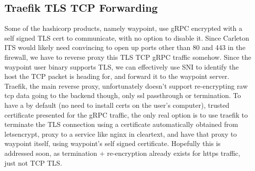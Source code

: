 \documentclass{article}
\begin{document}
\subsection{Traefik TLS TCP Forwarding}
Some of the hashicorp products, namely waypoint, use gRPC encrypted with a self signed TLS cert to communicate, with no option to disable it. Since Carleton ITS would likely need convincing to open up ports other than 80 and 443 in the firewall, we have to reverse proxy this TLS TCP gRPC traffic somehow. Since the waypoint user binary supports TLS, we can effectively use SNI to identify the host the TCP packet is heading for, and forward it to the waypoint server. Traefik, the main reverse proxy, unfortunately doesn't support re-encrypting raw tcp data going to the backend though, only ssl passthrough or termination. To have a by default (no need to install certs on the user's computer), trusted certificate presented for the gRPC traffic, the only real option is to use traefik to terminate the TLS connection using a certificate automatically obtained from letsencrypt, proxy to a service like nginx in cleartext, and have that proxy to waypoint itself, using waypoint's self signed certificate. Hopefully this is addressed soon, as termination + re-encryption already exists for https traffic, just not TCP TLS. 
\end{document}
